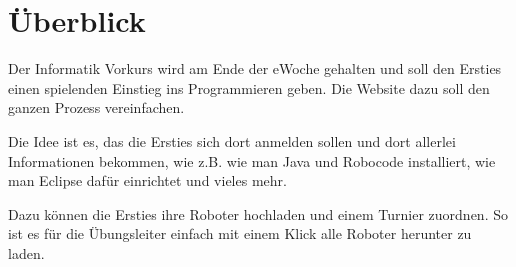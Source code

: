 \documentclass[Info_VK_Website_Dokumentation.tex]{subfiles}
\begin{document}
 	
\chapter{Überblick} 

Der Informatik Vorkurs wird am Ende der eWoche gehalten und soll den Ersties einen spielenden Einstieg ins Programmieren geben. Die Website dazu soll den ganzen Prozess vereinfachen.

Die Idee ist es, das die Ersties sich dort anmelden sollen und dort allerlei Informationen bekommen, wie z.B. wie man Java und Robocode installiert, wie man Eclipse dafür einrichtet und vieles mehr.

Dazu können die Ersties ihre Roboter hochladen und einem Turnier zuordnen. So ist es für die Übungsleiter einfach mit einem Klick alle Roboter herunter zu laden.

 
\end{document}
